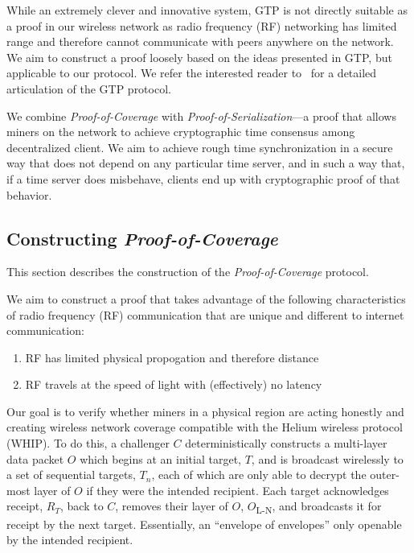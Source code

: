 \documentclass[letterpaper,11pt]{article}
\def\proofofcoverage/{\emph{Proof-of-Coverage}}
\begin{document}
While an extremely clever and innovative system, GTP is not directly suitable as a proof in our wireless network as radio frequency (RF) networking has limited range and therefore cannot communicate with peers anywhere on the network. We aim to construct a proof loosely based on the ideas presented in GTP, but applicable to our protocol. We refer the interested reader to~\cite{gtp} for a detailed articulation of the GTP protocol.\newline

We combine \proofofcoverage/ with \emph{Proof-of-Serialization}---a proof that allows miners on the network to achieve cryptographic time consensus among decentralized client. We aim to achieve rough time synchronization in a secure way that does not depend on any particular time server, and in such a way that, if a time server does misbehave, clients end up with cryptographic proof of that behavior.

\subsection{Constructing \proofofcoverage/}

This section describes the construction of the \proofofcoverage/ protocol.\newline

We aim to construct a proof that takes advantage of the following characteristics of radio frequency (RF) communication that are unique and different to internet communication:

\begin{enumerate}
	\item RF has limited physical propogation and therefore distance
	\item RF travels at the speed of light with (effectively) no latency
\end{enumerate}

Our goal is to verify whether miners in a physical region are acting honestly and creating wireless network coverage compatible with the Helium wireless protocol (WHIP). To do this, a challenger $\mathit{C}$ deterministically constructs a multi-layer data packet $\mathit{O}$ which begins at an initial target, $\mathit{T}$, and is broadcast wirelessly to a set of sequential targets, $\mathit{T_n}$, each of which are only able to decrypt the outer-most layer of $\mathit{O}$ if they were the intended recipient. Each target acknowledges receipt, $\mathit{R_T}$, back to $\mathit{C}$, removes their layer of $\mathit{O}$, $\mathit{O}$\textsubscript{L-N}, and broadcasts it for receipt by the next target. Essentially, an ``envelope of envelopes'' only openable by the intended recipient.\newline
\end{document}
